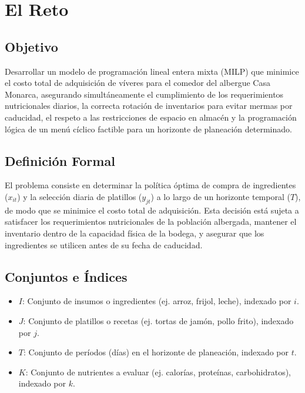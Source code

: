 \documentclass[12pt]{report}
\begin{document}
\newpage

\section{El Reto}

\subsection{Objetivo}
Desarrollar un modelo de programación lineal entera mixta (MILP) que minimice el costo total de adquisición de víveres para el comedor del albergue Casa Monarca, asegurando simultáneamente el cumplimiento de los requerimientos nutricionales diarios, la correcta rotación de inventarios para evitar mermas por caducidad, el respeto a las restricciones de espacio en almacén y la programación lógica de un menú cíclico factible para un horizonte de planeación determinado.

\subsection{Definición Formal}
El problema consiste en determinar la política óptima de compra de ingredientes ($x_{it}$) y la selección diaria de platillos ($y_{jt}$) a lo largo de un horizonte temporal ($T$), de modo que se minimice el costo total de adquisición. Esta decisión está sujeta a satisfacer los requerimientos nutricionales de la población albergada, mantener el inventario dentro de la capacidad física de la bodega, y asegurar que los ingredientes se utilicen antes de su fecha de caducidad.

\subsection{Conjuntos e Índices}
\begin{itemize}
    \item $I$: Conjunto de insumos o ingredientes (ej. arroz, frijol, leche), indexado por $i$.
    \item $J$: Conjunto de platillos o recetas (ej. tortas de jamón, pollo frito), indexado por $j$.
    \item $T$: Conjunto de períodos (días) en el horizonte de planeación, indexado por $t$.
    \item $K$: Conjunto de nutrientes a evaluar (ej. calorías, proteínas, carbohidratos), indexado por $k$.
\end{itemize}
\end{document}
